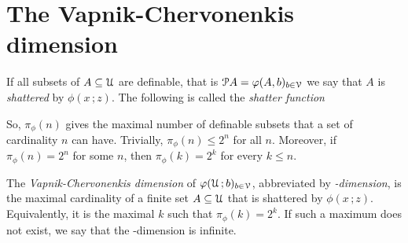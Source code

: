 \documentclass[scombinatorics.tex]{subfiles}
\begin{document}
  






\section{The Vapnik-Chervonenkis dimension}\label{VCdim}

If all subsets of $A\subseteq\EuScript U$ are definable, that is $\EuScript P A=\varphi(A,b)_{b\in\EuScript V}$ we say that $A$ is \emph{shattered\/} by $\phi(x\,;z)$.
The following is called the \emph{shatter function\/}



So, $\pi_\phi(n)$ gives the maximal number of definable subsets that a set of cardinality $n$ can have.
Trivially, $\pi_\phi(n)\le2^n$ for all $n$.
Moreover, if $\pi_\phi(n)=2^n$ for some $n$, then $\pi_\phi(k)=2^k$ for every $k\le n$.


The \emph{Vapnik-Cher\-vo\-nen\-kis dimension\/} of $\varphi(\EuScript U\,;b)_{b\in\EuScript V}$, abbreviated by \emph{\vc-dimension}, is the maximal cardinality of a finite set $A\subseteq\EuScript U$ that is shattered by $\phi(x\,;z)$.
Equivalently, it is the maximal $k$ such that $\pi_\phi(k)=2^k$.
If such a maximum does not exist,
we say that the \vc-dimension is infinite.
\end{document}
